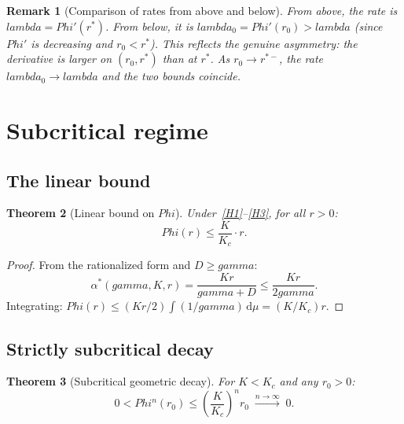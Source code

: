 \documentclass[11pt,a4paper]{article}
\let\Phi\relax\def\Phi{Phi}%
\let\lambda\relax\def\lambda{lambda}%
\let\gamma\relax\def\gamma{gamma}%
\newtheorem{theorem}{Theorem}[section]
\newtheorem{remark}[theorem]{Remark}
\theoremstyle{definition}
\begin{document}
\begin{remark}[Comparison of rates from above and below]\label{rem:rate-comparison}
From above, the rate is $\lambda = \Phi'(r^*)$. From below, it is $\lambda_0 = \Phi'(r_0) > \lambda$ (since $\Phi'$ is decreasing and $r_0 < r^*$). This reflects the genuine asymmetry: the derivative is larger on $(r_0, r^*)$ than at $r^*$. As $r_0 \to r^{*-}$, the rate $\lambda_0 \to \lambda$ and the two bounds coincide.
\end{remark}

\section{Subcritical regime}\label{sec:subcritical}

\subsection{The linear bound}

\begin{theorem}[Linear bound on $\Phi$]\label{thm:linear-bound}
Under~\ref{H1}--\ref{H3}, for all $r > 0$:
\begin{equation}\label{eq:linear}
\Phi(r) \leq \frac{K}{K_c} \cdot r.
\end{equation}
\end{theorem}

\begin{proof}
From the rationalized form and $D \geq \gamma$:
\[
\alpha^*(\gamma, K, r) = \frac{Kr}{\gamma + D} \leq \frac{Kr}{2\gamma}.
\]
Integrating: $\Phi(r) \leq (Kr/2) \int (1/\gamma)\,\mathrm{d}\mu = (K/K_c) r$.
\end{proof}

\subsection{Strictly subcritical decay}

\begin{theorem}[Subcritical geometric decay]\label{thm:subcritical}
For $K < K_c$ and any $r_0 > 0$:
\begin{equation}\label{eq:subcritical}
0 < \Phi^n(r_0) \leq \left(\frac{K}{K_c}\right)^n r_0 \;\xrightarrow{n\to\infty}\; 0.
\end{equation}
\end{theorem}
\end{document}

